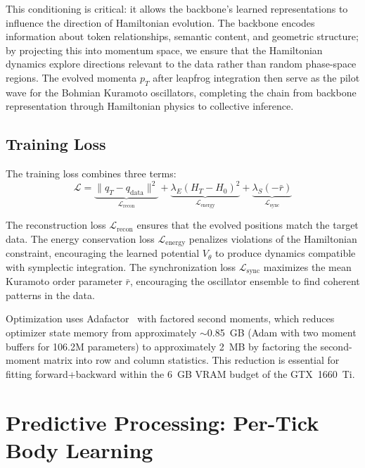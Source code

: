 \documentclass[11pt,a4paper,twocolumn]{article}
\begin{document}
This conditioning is critical: it allows the backbone's learned representations to influence the direction of Hamiltonian evolution.
The backbone encodes information about token relationships, semantic content, and geometric structure; by projecting this into momentum space, we ensure that the Hamiltonian dynamics explore directions relevant to the data rather than random phase-space regions.
The evolved momenta $p_T$ after leapfrog integration then serve as the pilot wave for the Bohmian Kuramoto oscillators, completing the chain from backbone representation through Hamiltonian physics to collective inference.

\subsection{Training Loss}

The training loss combines three terms:
\begin{equation}
\mathcal{L} = \underbrace{\|q_T - q_{\mathrm{data}}\|^2}_{\mathcal{L}_{\mathrm{recon}}} + \underbrace{\lambda_E (H_T - H_0)^2}_{\mathcal{L}_{\mathrm{energy}}} + \underbrace{\lambda_S (-\bar{r})}_{\mathcal{L}_{\mathrm{sync}}}
\label{eq:total_loss}
\end{equation}

The reconstruction loss $\mathcal{L}_{\mathrm{recon}}$ ensures that the evolved positions match the target data.
The energy conservation loss $\mathcal{L}_{\mathrm{energy}}$ penalizes violations of the Hamiltonian constraint, encouraging the learned potential $V_\theta$ to produce dynamics compatible with symplectic integration.
The synchronization loss $\mathcal{L}_{\mathrm{sync}}$ maximizes the mean Kuramoto order parameter $\bar{r}$, encouraging the oscillator ensemble to find coherent patterns in the data.

Optimization uses Adafactor~\cite{shazeer2018} with factored second moments, which reduces optimizer state memory from approximately $\sim$0.85~GB (Adam with two moment buffers for 106.2M parameters) to approximately 2~MB by factoring the second-moment matrix into row and column statistics.
This reduction is essential for fitting forward+backward within the 6~GB VRAM budget of the GTX~1660~Ti.

\section{Predictive Processing: Per-Tick Body Learning}
\label{sec:predictive_processing}
\end{document}

